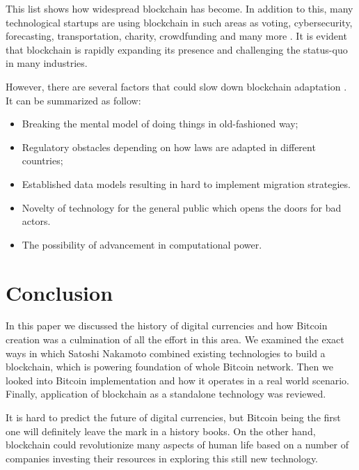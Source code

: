 \documentclass[conference,compsoc]{IEEEtran}
\begin{document}
This list shows how widespread blockchain has become. 
In addition to this, many technological startups are using blockchain in such areas as voting, cybersecurity, forecasting, transportation, charity, crowdfunding and many more \cite{futurethinkers}. 
It is evident that blockchain is rapidly expanding its presence and challenging the status-quo in many industries. 

However, there are several factors that could slow down blockchain adaptation \cite{beyond}.
It can be summarized as follow:
\begin{itemize}
    \item Breaking the mental model of doing things in old-fashioned way;
    \item Regulatory obstacles depending on how laws are adapted in different countries;
    \item Established data models resulting in hard to implement migration strategies.
    \item Novelty of technology for the general public which opens the doors for bad actors.
    \item The possibility of advancement in computational power.
\end{itemize}

\section{Conclusion}
In this paper we discussed the history of digital currencies and how Bitcoin creation was a culmination of all the effort in this area. 
We examined the exact ways in which Satoshi Nakamoto combined existing technologies to build a blockchain, which is powering foundation of whole Bitcoin network. 
Then we looked into Bitcoin implementation and how it operates in a real world scenario.
Finally, application of blockchain as a standalone technology was reviewed. 

It is hard to predict the future of digital currencies, but Bitcoin being the first one will definitely leave the mark in a history books.
On the other hand, blockchain could revolutionize many aspects of human life based on a number of companies investing their resources in exploring this still new technology. 








\end{document}
